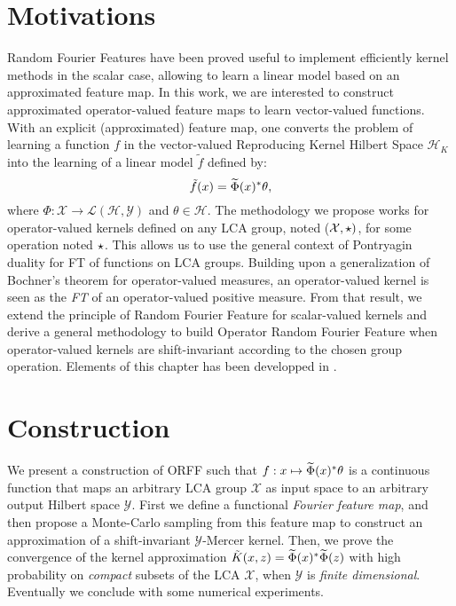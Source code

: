 \section{Motivations}
\label{sec:motivations}
Random Fourier Features have been proved useful to implement efficiently kernel methods in the scalar case, allowing to learn a linear model based on an approximated feature map. In this work, we are interested to construct approximated operator-valued feature maps to learn vector-valued functions. With an explicit (approximated) feature map, one converts the problem of learning a function $f$ in the vector-valued Reproducing Kernel Hilbert Space $\mathcal{H}_K$ into the learning of a linear model $\tilde{f}$ defined by:
 \begin{dmath*}
 \tilde{f}(x) = \tildePhi{\omega}(x)^\adjoint  \theta,
 \end{dmath*}
 where $\Phi: \mathcal{X} \to \mathcal{L}(\mathcal{H},\mathcal{Y})$ and $\theta \in \mathcal{H}$. The methodology we propose works for operator-valued kernels defined on any \acf{LCA} group, noted ($\mathcal{X}, \star)$, for some operation noted $\star$. This allows us to use the general context of Pontryagin duality for \acl{FT} of functions on \acs{LCA} groups. Building upon a generalization of Bochner's theorem for operator-valued measures, an operator-valued kernel is seen as the \emph{\acl{FT}} of an operator-valued positive measure. From that result, we extend the principle of Random Fourier Feature for scalar-valued kernels and derive a general methodology to build Operator Random Fourier Feature when operator-valued kernels are shift-invariant according to the chosen group operation. Elements of this chapter has been developped in \citet{brault2016random}.

\clearpage
\section{Construction}
\label{sec:construction}
We present a construction of \acf{ORFF} such that $f: x\mapsto \widetilde{\Phi}(x)^* \theta$ is a continuous function that maps an arbitrary \acs{LCA} group $\mathcal{X}$ as input space to an arbitrary output Hilbert space $\mathcal{Y}$. First we define a functional \emph{Fourier feature map}, and then propose a Monte-Carlo sampling from this feature map to construct an approximation of a shift-invariant $\mathcal{Y}$-Mercer kernel.
Then, we prove the convergence of the kernel approximation $\tilde{K}(x,z)=\widetilde{\Phi}(x)^* \widetilde{\Phi}(z)$ with high probability on \emph{compact} subsets of the \acs{LCA} $\mathcal{X}$, when $\mathcal{Y}$ is \emph{finite dimensional}. Eventually we conclude with some numerical experiments.
